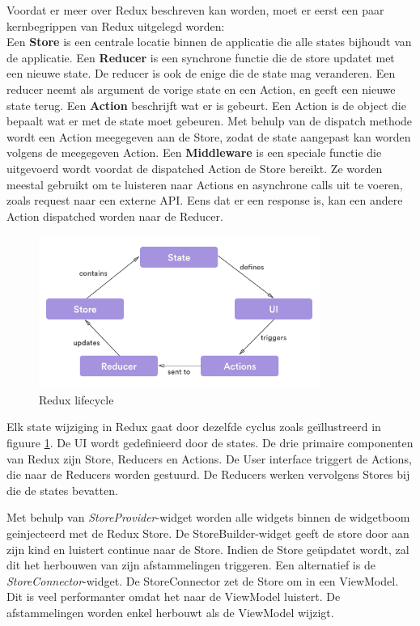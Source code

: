 Voordat er meer over Redux beschreven kan worden, moet er eerst een paar kernbegrippen van Redux uitgelegd worden: 
\\
Een \textbf{Store} is een centrale locatie binnen de applicatie die alle states bijhoudt van de applicatie. Een \textbf{Reducer} is een synchrone functie die de store updatet met een nieuwe state. De reducer is ook de enige 
die de state mag veranderen. Een reducer neemt als argument de vorige state en een Action, en geeft een nieuwe state terug. Een \textbf{Action} beschrijft wat er is gebeurt. Een Action is de object die bepaalt wat er met de state moet gebeuren. 
Met behulp van de dispatch methode wordt een Action meegegeven aan de Store, zodat de state aangepast kan worden volgens de meegegeven Action.
Een \textbf{Middleware} is een speciale functie die uitgevoerd wordt voordat de dispatched Action de Store bereikt. Ze worden meestal gebruikt om te luisteren naar Actions en
asynchrone calls uit te voeren, zoals request naar een externe API. Eens dat er een response is, kan een andere Action dispatched worden naar de Reducer. 
\\
\begin{figure}[h]
    \centering
    \includegraphics[height=5cm, keepaspectratio]{graphics/reduxcycle.png}
    \caption{Redux lifecycle \autocite{Sharma2018}}
    \label{fig:lifecycle}
\end{figure}
Elk state wijziging in Redux gaat door dezelfde cyclus zoals geïllustreerd in figuure \ref{fig:lifecycle}. 
De UI wordt gedefinieerd door de states. De drie primaire componenten van Redux zijn Store, Reducers en Actions. 
De User interface triggert de Actions, die naar de Reducers worden gestuurd. De Reducers werken vervolgens Stores bij die de states bevatten. 





Met behulp van \textit{StoreProvider}-widget worden alle widgets binnen de widgetboom geinjecteerd met de Redux Store. 
De StoreBuilder-widget geeft de store door aan zijn kind en luistert continue naar de Store. Indien de Store geüpdatet wordt, zal dit het herbouwen van zijn afstammelingen triggeren.
Een alternatief is de \textit{StoreConnector}-widget. De StoreConnector zet de Store om in een ViewModel. Dit is veel performanter omdat het naar de ViewModel luistert. De afstammelingen worden enkel herbouwt als de ViewModel wijzigt.

